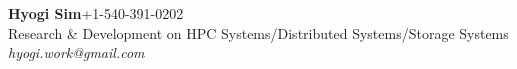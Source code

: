 {\textbf{\Large Hyogi Sim}\hfill{\small +1-540-391-0202}}\\
{\small
{Research \& Development on HPC Systems/Distributed Systems/Storage Systems}
    \hfill{\emph{\small hyogi.work@gmail.com}}\\
}
